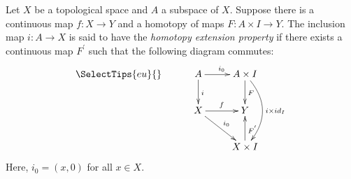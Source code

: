 \documentclass{article}
\begin{document}
Let $X$ be a topological space and $A$ a subspace of $X$. Suppose there is a continuous map $f:X \to Y$ and a homotopy of maps $F: A \times I \to Y$. The inclusion map $i: A \to X$ is said to have the \emph{homotopy extension property} if there exists a continuous map $F^{'}$ such that the following diagram commutes:
$$
\SelectTips{eu}{}
\xymatrix{
& A \ar[d]^{i} \ar[r]^{i_{0}} & A \times I \ar[d]^{F} \ar@/^1.5pc/[dd]^{i \times id_{I}} \\
& X \ar[r]^{f} \ar[dr]^{i_{0}} & Y \\
& &  X \times I \ar[u]_{F^{'}} 
}
$$
Here, $i_0=(x,0)$ for all $ x \in X$.
\end{document}
